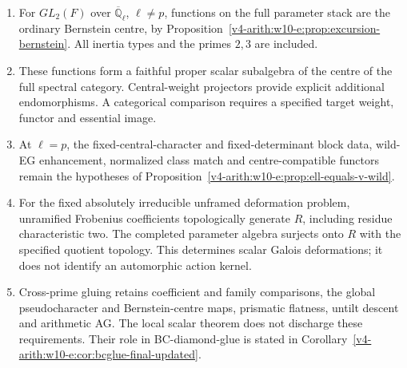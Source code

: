 \begin{enumerate}
\item For $GL_2(F)$ over $\overline{\mathbb Q}_\ell$, $\ell\neq p$,
functions on the full parameter stack are the ordinary Bernstein
centre, by Proposition~\ref{v4-arith:w10-e:prop:excursion-bernstein}. All inertia
types and the primes $2,3$ are included.
\item These functions form a faithful proper scalar subalgebra of
the centre of the full spectral category. Central-weight projectors
provide explicit additional endomorphisms. A categorical comparison
requires a specified target weight, functor and essential image.
\item At $\ell=p$, the fixed-central-character and fixed-determinant
block data, wild-EG enhancement, normalized class match and
centre-compatible functors remain the hypotheses of
Proposition~\ref{v4-arith:w10-e:prop:ell-equals-v-wild}.
\item For the fixed absolutely irreducible unframed deformation problem,
unramified Frobenius coefficients topologically generate $R$, including
residue characteristic two. The completed parameter algebra surjects
onto $R$ with the specified quotient topology. This determines scalar
Galois deformations; it does not identify an automorphic action kernel.
\item Cross-prime gluing retains coefficient and family comparisons,
the global pseudocharacter and Bernstein-centre maps, prismatic
flatness, untilt descent and arithmetic AG. The local scalar theorem
does not discharge these requirements. Their role in BC-diamond-glue
is stated in Corollary~\ref{v4-arith:w10-e:cor:bcglue-final-updated}.
\end{enumerate}
